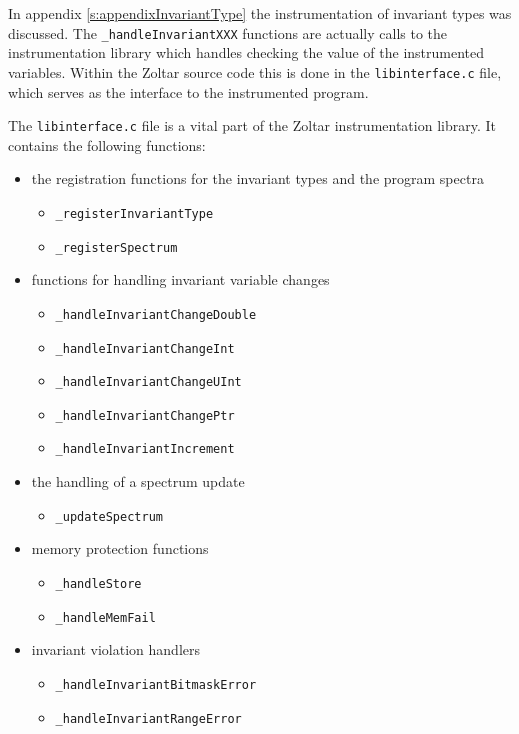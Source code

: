 
In appendix \ref{s:appendixInvariantType}
the instrumentation of invariant types was discussed.
The \texttt{\_handleInvariantXXX} functions are actually calls to
the instrumentation library which handles checking the value of 
the instrumented variables.
Within the Zoltar source code this is done in the \texttt{libinterface.c}
file, which serves as the interface to the instrumented program.


The \texttt{libinterface.c} file is a vital part of the Zoltar instrumentation library. 
It contains the following functions:
\begin{itemize}
\item{the registration functions for the invariant types and the program spectra}
 \begin{itemize}
 \item{\texttt{\_registerInvariantType}}
 \item{\texttt{\_registerSpectrum}}
 \end{itemize}
\item{functions for handling invariant variable changes}
 \begin{itemize}
 \item{\texttt{\_handleInvariantChangeDouble}}
 \item{\texttt{\_handleInvariantChangeInt}}
 \item{\texttt{\_handleInvariantChangeUInt}}
 \item{\texttt{\_handleInvariantChangePtr}}
 \item{\texttt{\_handleInvariantIncrement}}
 \end{itemize}
\item{the handling of a spectrum update}
 \begin{itemize}
 \item{\texttt{\_updateSpectrum}}
 \end{itemize}
\item{memory protection functions}
 \begin{itemize}
 \item{\texttt{\_handleStore}}
 \item{\texttt{\_handleMemFail}}
 \end{itemize}
\item{invariant violation handlers}
 \begin{itemize}
 \item{\texttt{\_handleInvariantBitmaskError}}
 \item{\texttt{\_handleInvariantRangeError}}
 \end{itemize}
\end{itemize}

